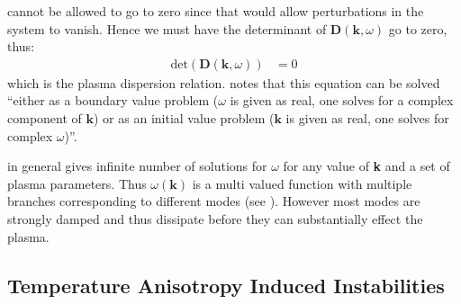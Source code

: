             cannot be allowed to go to zero since that would allow perturbations in the system to
            vanish. Hence we must have the determinant of $\mathbf{D}(\mathbf{k},\omega)$ go to
            zero, thus:
            \begin{align}
                \mathrm{det}(\mathbf{D}(\mathbf{k},\omega)) & = 0 \label{eq:disp3}
            \end{align}
            which is the plasma dispersion relation. \citet{Gary1993} notes that this equation can
            be solved ``either as a boundary value problem ($\omega$ is given as real, one solves
            for a complex component of $\mathbf{k}$) or as an initial value problem ($\mathbf{k}$ is
            given as real, one solves for complex $\omega$)''.
            
             in general gives infinite number of solutions for $\omega$ for any value
            of \textbf{k} and a set of plasma parameters. Thus $\omega (\mathbf{k})$ is a multi
            valued function with multiple branches corresponding to different modes (see
            \citet[Figure 2]{Schwartz1980}). However most modes are strongly damped and thus
            dissipate before they can substantially effect the plasma.

        \subsection{Temperature Anisotropy Induced Instabilities} \label{sec:instab2}

